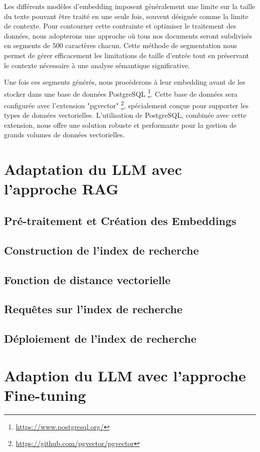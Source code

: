 Les différents modèles d'embedding imposent généralement une limite sur la taille du texte pouvant être traité en une seule fois, souvent désignée comme la limite de contexte. Pour contourner cette contrainte et optimiser le traitement des données, nous adopterons une approche où tous nos documents seront subdivisés en segments de 500 caractères chacun. Cette méthode de segmentation nous permet de gérer efficacement les limitations de taille d'entrée tout en préservant le contexte nécessaire à une analyse sémantique significative.

Une fois ces segments générés, nous procéderons à leur embedding avant de les stocker dans une base de données PostgreSQL \footnote{\href{https://www.postgresql.org/}{https://www.postgresql.org/}}. Cette base de données sera configurée avec l'extension "pgvector" \footnote{\href{https://github.com/pgvector/pgvector}{https://github.com/pgvector/pgvector}}, spécialement conçue pour supporter les types de données vectorielles. L'utilisation de PostgreSQL, combinée avec cette extension, nous offre une solution robuste et performante pour la gestion de grands volumes de données vectorielles.


\newpage
\newpage
\newpage
\section{Adaptation du LLM avec l'approche RAG}
\subsection{Pré-traitement et Création des Embeddings}
\subsection{Construction de l'index de recherche}
\subsection{Fonction de distance vectorielle}
\subsection{Requêtes sur l'index de recherche}
\subsection{Déploiement de l'index de recherche}


\newpage
\newpage
\section{Adaption du LLM avec l'approche Fine-tuning}
